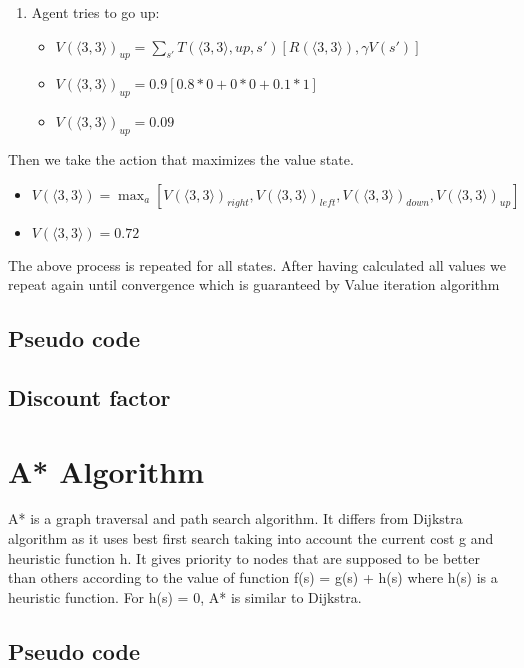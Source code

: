 \documentclass[10pt,a4paper,twocolumn]{article}
\begin{document}
\begin{enumerate}
		\item Agent tries to go up: 
		\begin{itemize}
			\item $V(\big \langle 3,3 \big \rangle)_{up} = \sum_{s'} T(\big \langle 3,3 \big \rangle, up, s') [R(\big \langle 3,3 \big \rangle), \gamma V(s')]
			$
		\end{itemize}
		\begin{itemize}
			\item $V(\big \langle 3,3 \big \rangle)_{up} = 0.9[0.8 * 0 + 0 * 0 + 0.1 * 1]$
		\end{itemize}
		\begin{itemize}
			\item $V(\big \langle 3,3 \big \rangle)_{up} = 0.09$
		\end{itemize}
	\end{enumerate}

	Then we take the action that maximizes the value state. 
		
	\begin{itemize}
		\item $V(\big \langle 3,3 \big \rangle) = \max_{a} [V(\big \langle 3,3 \big 
		\rangle)_{right},V(\big \langle 3,3 \big \rangle)_{left}, V(\big \langle 3,3 \big \rangle)_{down}, V(\big \langle 3,3 \big \rangle)_{up}]$
	\end{itemize}
		\begin{itemize}
		\item $V(\big \langle 3,3 \big \rangle) = 0.72$
	\end{itemize}
	The above process is repeated for all states. After having calculated all values we repeat again until convergence which is guaranteed by Value iteration algorithm
	\subsection{Pseudo code}
	\subsection{Discount factor}
	\section{A* Algorithm}
	A* is a graph traversal and path search algorithm. It differs from Dijkstra algorithm as it uses best first search taking into account the current cost g and heuristic function h. It gives priority to nodes that are supposed to be better than others according to the value of function f(s) = g(s) + h(s) where h(s) is a heuristic function. For h(s) = 0, A* is similar to Dijkstra.
	\subsection{Pseudo code}
\end{document}
